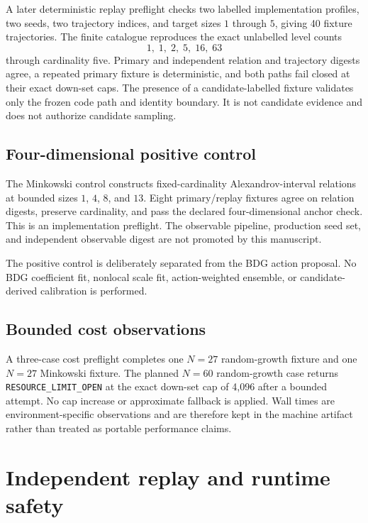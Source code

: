 \documentclass[11pt]{article}
\newcommand{\code}[1]{\texttt{#1}}
\begin{document}
A later deterministic replay preflight checks two labelled implementation
profiles, two seeds, two trajectory indices, and target sizes $1$ through $5$,
giving 40 fixture trajectories.  The finite catalogue reproduces the exact
unlabelled level counts
\[
  1,\;1,\;2,\;5,\;16,\;63
\]
through cardinality five.  Primary and independent relation and trajectory
digests agree, a repeated primary fixture is deterministic, and both paths fail
closed at their exact down-set caps.  The presence of a candidate-labelled
fixture validates only the frozen code path and identity boundary.  It is not
candidate evidence and does not authorize candidate sampling.

\subsection{Four-dimensional positive control}

The Minkowski control constructs fixed-cardinality Alexandrov-interval
relations at bounded sizes $1$, $4$, $8$, and $13$.  Eight primary/replay
fixtures agree on relation digests, preserve cardinality, and pass the declared
four-dimensional anchor check.  This is an implementation preflight.  The
observable pipeline, production seed set, and independent observable digest
are not promoted by this manuscript.

The positive control is deliberately separated from the BDG action proposal.
No BDG coefficient fit, nonlocal scale fit, action-weighted ensemble, or
candidate-derived calibration is performed.

\subsection{Bounded cost observations}

A three-case cost preflight completes one $N=27$ random-growth fixture and one
$N=27$ Minkowski fixture.  The planned $N=60$ random-growth case returns
\code{RESOURCE\_LIMIT\_OPEN} at the exact down-set cap of 4,096 after a bounded
attempt.  No cap increase or approximate fallback is applied.  Wall times are
environment-specific observations and are therefore kept in the machine
artifact rather than treated as portable performance claims.

\section{Independent replay and runtime safety}
\end{document}

